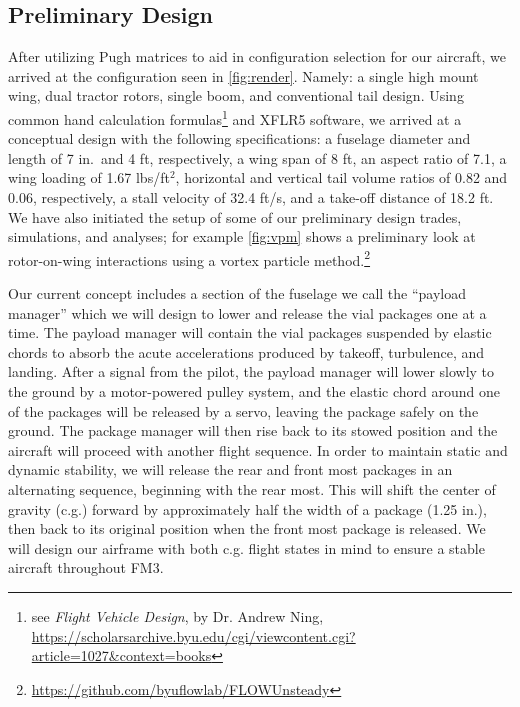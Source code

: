 \subsection{Preliminary Design}
\label{ssec:PreliminaryDesign}




After utilizing Pugh matrices to aid in configuration selection for our aircraft, we arrived at the configuration seen in \cref{fig:render}.
Namely: a single high mount wing, dual tractor rotors, single boom, and conventional tail design.
Using common hand calculation formulas\footnote{see \textit{Flight Vehicle Design}, by Dr. Andrew Ning, \url{https://scholarsarchive.byu.edu/cgi/viewcontent.cgi?article=1027&context=books}} and XFLR5 software, we arrived at a conceptual design with the following specifications: a fuselage diameter and length of  7 in.~and  4 ft, respectively, a wing span of 8 ft, an aspect ratio of 7.1, a wing loading of 1.67 lbs/ft$^2$, horizontal and vertical tail volume ratios of 0.82 and 0.06, respectively, a stall velocity of 32.4 ft/s, and a take-off distance of 18.2 ft. We have also initiated the setup of some of our preliminary design trades, simulations, and analyses; for example \cref{fig:vpm} shows a preliminary look at rotor-on-wing interactions using a vortex particle method.\footnote{\url{https://github.com/byuflowlab/FLOWUnsteady}}

Our current concept includes a section of the fuselage we call the ``payload manager'' which we will design to lower and release the vial packages one at a time.  The payload manager will contain the vial packages suspended by elastic chords to absorb the acute accelerations produced by takeoff, turbulence, and landing.  After a signal from the pilot, the payload manager will lower slowly to the ground by a motor-powered pulley system, and the elastic chord around one of the packages will be released by a servo, leaving the package safely on the ground. The package manager will then rise back to its stowed position and the aircraft will proceed with another flight sequence.  In order to maintain static and dynamic stability, we will release the rear and front most packages in an alternating sequence, beginning with the rear most. This will shift the center of gravity (c.g.) forward by approximately half the width of a package (1.25 in.), then back to its original position when the front most package is released.  We will design our airframe with both c.g. flight states in mind to ensure a stable aircraft throughout FM3.

